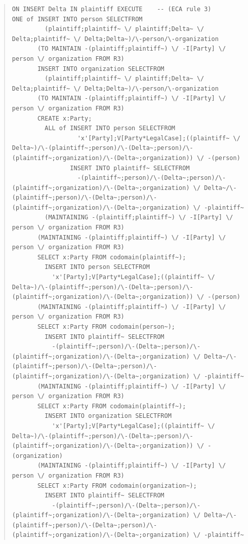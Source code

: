 \documentclass[10pt,a4paper]{report}              %
\theoremstyle{plain}\theorembodyfont{\rmfamily}\newtheorem{definition}{Definition}[section]
\theoremstyle{plain}\theorembodyfont{\rmfamily}\newtheorem{designrule}[definition]{Requirement}
\begin{document}
\begin{quote}
\begin{verbatim}
ON INSERT Delta IN plaintiff EXECUTE    -- (ECA rule 3)
ONE of INSERT INTO person SELECTFROM
         (plaintiff;plaintiff~ \/ plaintiff;Delta~ \/ Delta;plaintiff~ \/ Delta;Delta~)/\-person/\-organization
       (TO MAINTAIN -(plaintiff;plaintiff~) \/ -I[Party] \/ person \/ organization FROM R3)
       INSERT INTO organization SELECTFROM
         (plaintiff;plaintiff~ \/ plaintiff;Delta~ \/ Delta;plaintiff~ \/ Delta;Delta~)/\-person/\-organization
       (TO MAINTAIN -(plaintiff;plaintiff~) \/ -I[Party] \/ person \/ organization FROM R3)
       CREATE x:Party;
         ALL of INSERT INTO person SELECTFROM
                  'x'[Party];V[Party*LegalCase];((plaintiff~ \/ Delta~)/\-(plaintiff~;person)/\-(Delta~;person)/\-(plaintiff~;organization)/\-(Delta~;organization)) \/ -(person)
                INSERT INTO plaintiff~ SELECTFROM
                  -(plaintiff~;person)/\-(Delta~;person)/\-(plaintiff~;organization)/\-(Delta~;organization) \/ Delta~/\-(plaintiff~;person)/\-(Delta~;person)/\-(plaintiff~;organization)/\-(Delta~;organization) \/ -plaintiff~
         (MAINTAINING -(plaintiff;plaintiff~) \/ -I[Party] \/ person \/ organization FROM R3)
       (MAINTAINING -(plaintiff;plaintiff~) \/ -I[Party] \/ person \/ organization FROM R3)
       SELECT x:Party FROM codomain(plaintiff~);
         INSERT INTO person SELECTFROM
           'x'[Party];V[Party*LegalCase];((plaintiff~ \/ Delta~)/\-(plaintiff~;person)/\-(Delta~;person)/\-(plaintiff~;organization)/\-(Delta~;organization)) \/ -(person)
       (MAINTAINING -(plaintiff;plaintiff~) \/ -I[Party] \/ person \/ organization FROM R3)
       SELECT x:Party FROM codomain(person~);
         INSERT INTO plaintiff~ SELECTFROM
           -(plaintiff~;person)/\-(Delta~;person)/\-(plaintiff~;organization)/\-(Delta~;organization) \/ Delta~/\-(plaintiff~;person)/\-(Delta~;person)/\-(plaintiff~;organization)/\-(Delta~;organization) \/ -plaintiff~
       (MAINTAINING -(plaintiff;plaintiff~) \/ -I[Party] \/ person \/ organization FROM R3)
       SELECT x:Party FROM codomain(plaintiff~);
         INSERT INTO organization SELECTFROM
           'x'[Party];V[Party*LegalCase];((plaintiff~ \/ Delta~)/\-(plaintiff~;person)/\-(Delta~;person)/\-(plaintiff~;organization)/\-(Delta~;organization)) \/ -(organization)
       (MAINTAINING -(plaintiff;plaintiff~) \/ -I[Party] \/ person \/ organization FROM R3)
       SELECT x:Party FROM codomain(organization~);
         INSERT INTO plaintiff~ SELECTFROM
           -(plaintiff~;person)/\-(Delta~;person)/\-(plaintiff~;organization)/\-(Delta~;organization) \/ Delta~/\-(plaintiff~;person)/\-(Delta~;person)/\-(plaintiff~;organization)/\-(Delta~;organization) \/ -plaintiff~

\end{verbatim}
\end{quote}
\end{document}
